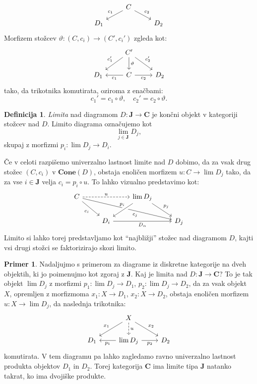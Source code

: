 \documentclass[12pt,a4paper]{book}
\theoremstyle{definition}
\newtheorem{definicija}{Definicija}[chapter]
\theoremstyle{plain}
\theoremstyle{definition}
\newtheorem{primer}{Primer}[section]
\theoremstyle{remark}
\newcommand{\cat}[1]{\textbf{#1}}
\begin{document}
%
$$\begin{tikzcd}[column sep=normal, row sep=small]
& C \ar[dl, "c_1"'] \ar[dr, "c_2"] & \\
D_1 && D_2
\end{tikzcd}$$
%
Morfizem stožcev $\vartheta : (C,c_i) \to (C', c_i')$ zgleda kot:
%
$$\begin{tikzcd}
& C' \ar[dl, "c_1'"'] \ar[d, "\vartheta"] \ar[dr, "c_2'"] & \\
D_1 & C \ar[l, "c_1"] \ar[r, "c_2"'] & D_2
\end{tikzcd}$$
%
tako, da trikotnika komutirata, oziroma z enačbami:
$$c_1' = c_1 \circ \vartheta, \quad c_2' = c_2 \circ \vartheta.$$
%
\begin{definicija}
\emph{Limita} nad diagramom $D : \cat{J} \to \cat{C}$ je končni objekt v kategoriji stožcev nad $D$. Limito diagrama označujemo kot
$$\lim_{j \in \cat{J}}D_j,$$
skupaj z morfizmi $p_i : \lim D_j \to D_i$.
\end{definicija}
%
Če v celoti razpišemo univerzalno lastnost limite nad $D$ dobimo, da za vsak drug stožec $(C,c_i)$ v $\cat{Cone}(D)$, obstaja enoličen morfizem $u : C \to \lim D_j$ tako, da za vse $i \in \cat{J}$ velja $c_i = p_i \circ u$. To lahko vizualno predstavimo kot:
%
$$\begin{tikzcd}
C \ar[rr, dashed, "u"] \ar[drrr, pos=7/11, "c_j"'] \ar[dr, "c_i"'] & & \lim D_j \ar[dl, crossing over, pos=1/3, "p_i"'] \ar[dr, "p_j"] \\
& D_i \ar[rr, "D_\alpha"'] & & D_j
\end{tikzcd}$$
%
Limito si lahko torej predstavljamo kot "`najbližji"' stožec nad diagramom $D$, kajti vsi drugi stožci se faktorizirajo skozi limito. 

\begin{primer}
Nadaljujmo s primerom za diagrame iz diskretne kategorije na dveh objektih, ki jo poimenujmo kot zgoraj z $\cat{J}$. Kaj je limita nad $D : \cat{J} \to \cat{C}$? To je tak objekt $\lim D_j$ z morfizmi $p_1 : \lim D_j \to D_1$, $p_2 : \lim D_j \to D_2$, da za vsak objekt $X$, opremljen z morfizmoma $x_1 : X \to D_1$, $x_2 : X \to D_2$, obstaja enoličen morfizem $u : X \to \lim D_j$, da naslednja trikotnika:
%
$$\begin{tikzcd}
& X \ar[dl, "x_1"'] \ar[d, dashed, "u"] \ar[dr, "x_2"] & \\
D_1 & \lim D_j \ar[l, "p_1"] \ar[r, "p_2"'] & D_2
\end{tikzcd}$$
komutirata. V tem diagramu pa lahko zagledamo ravno univerzalno lastnost produkta objektov $D_1$ in $D_2$. Torej kategorija $\cat{C}$ ima limite tipa $\cat{J}$ natanko takrat, ko ima dvojiške produkte.

\end{primer}
\end{document}
